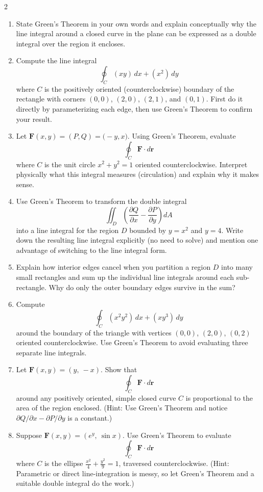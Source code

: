 \begin{multicols}{2}
\begin{enumerate}
\item 
State Green's Theorem in your own words and explain conceptually why the line integral around a closed curve in the plane can be expressed as a double integral over the region it encloses.

\item \enspace
Compute the line integral
\[
\oint_C (xy)\,dx + (x^2)\,dy
\]
where \(C\) is the positively oriented (counterclockwise) boundary of the rectangle with corners \((0,0)\), \((2,0)\), \((2,1)\), and \((0,1)\). First do it directly by parameterizing each edge, then use Green's Theorem to confirm your result.

\item \enspace
Let \(\mathbf{F}(x,y) = (P,Q) = \bigl(-y,x\bigr)\). Using Green's Theorem, evaluate
\[
\oint_C \mathbf{F}\cdot d\mathbf{r}
\]
where \(C\) is the unit circle \(x^2+y^2=1\) oriented counterclockwise. Interpret physically what this integral measures (circulation) and explain why it makes sense.

\item \enspace
Use Green's Theorem to transform the double integral
\[
\iint_D \left(\frac{\partial Q}{\partial x} - \frac{\partial P}{\partial y}\right)dA
\]
into a line integral for the region \(D\) bounded by \(y=x^2\) and \(y=4\). Write down the resulting line integral explicitly (no need to solve) and mention one advantage of switching to the line integral form.

\item \enspace
Explain how interior edges cancel when you partition a region \(D\) into many small rectangles and sum up the individual line integrals around each sub-rectangle. Why do only the outer boundary edges survive in the sum?

\item \enspace
Compute
\[
\oint_C (x^2y^2)\,dx + (xy^3)\,dy
\]
around the boundary of the triangle with vertices \((0,0)\), \((2,0)\), \((0,2)\) oriented counterclockwise. Use Green's Theorem to avoid evaluating three separate line integrals.

\item \enspace
Let \(\mathbf{F}(x,y) = (y,\ -x)\). Show that
\[
\oint_C \mathbf{F}\cdot d\mathbf{r}
\]
around any positively oriented, simple closed curve \(C\) is proportional to the area of the region enclosed. (Hint: Use Green’s Theorem and notice \(\partial Q/\partial x - \partial P/\partial y\) is a constant.)

\item \enspace
Suppose \(\mathbf{F}(x,y) = (e^y,\ \sin x)\). Use Green’s Theorem to evaluate
\[
\oint_C \mathbf{F}\cdot d\mathbf{r}
\]
where \(C\) is the ellipse \(\frac{x^2}{4} + \frac{y^2}{9} = 1\), traversed counterclockwise. (Hint: Parametric or direct line-integration is messy, so let Green’s Theorem and a suitable double integral do the work.)


\end{enumerate}
\end{multicols}
